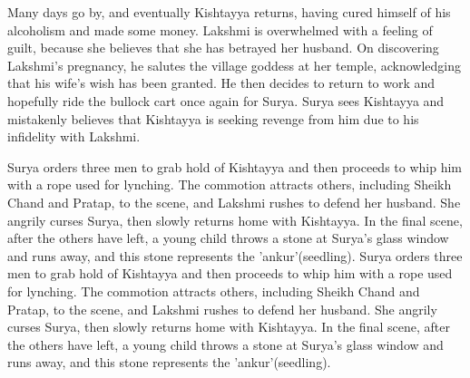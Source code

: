 \documentclass{article}
\begin{document}
Many days go by, and eventually Kishtayya returns, having cured himself of his alcoholism and made some money. Lakshmi is overwhelmed with a feeling of guilt, because she believes that she has betrayed her husband. On discovering Lakshmi's pregnancy, he salutes the village goddess at her temple, acknowledging that his wife's wish has been granted. He then decides to return to work and hopefully ride the bullock cart once again for Surya. Surya sees Kishtayya and mistakenly believes that Kishtayya is seeking revenge from him due to his infidelity with Lakshmi.

Surya orders three men to grab hold of Kishtayya and then proceeds to whip him with a rope used for lynching. The commotion attracts others, including Sheikh Chand and Pratap, to the scene, and Lakshmi rushes to defend her husband. She angrily curses Surya, then slowly returns home with Kishtayya. In the final scene, after the others have left, a young child throws a stone at Surya's glass window and runs away, and this stone represents the 'ankur'(seedling).
Surya orders three men to grab hold of Kishtayya and then proceeds to whip him with a rope used for lynching. The commotion attracts others, including Sheikh Chand and Pratap, to the scene, and Lakshmi rushes to defend her husband. She angrily curses Surya, then slowly returns home with Kishtayya. In the final scene, after the others have left, a young child throws a stone at Surya's glass window and runs away, and this stone represents the 'ankur'(seedling).
\end{document}
